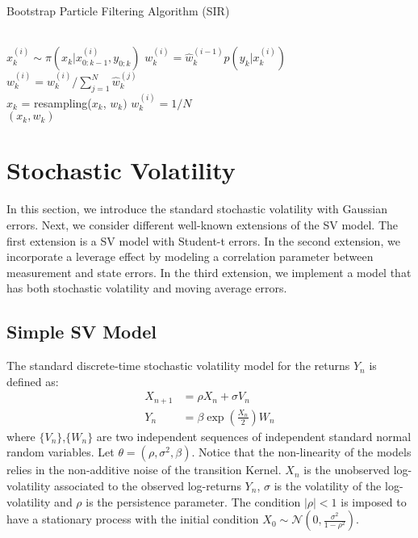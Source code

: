 \documentclass[11pt,a4,twosided,singlespacing,titlepagenumber=on]{scrreprt}
\numberwithin{equation}{chapter} %
\theoremstyle{remark}
\begin{document}
\begin{algorithm}
\caption{Bootstrap Particle Filtering Algorithm (SIR)}\label{euclid}
\begin{algorithmic}[1]
\Procedure{}{}
\\
	\State $x_k^{(i)} \sim \pi(x_k | x_{0:k-1}^{(i)}, y_{0:k})$
	\State $w_k^{(i)} = \hat{w}_k^{(i-1)} p(y_k | x_k^{(i)})$
\\
	\State $w_k^{(i)} = \hat{w}_k^{(i)} / \sum_{j=1}^N \hat{w}_k^{(j)} $
\\
\State $x_k$ = resampling($x_k$, $w_k)$
	\State $w_k^{(i)} = 1 / N$
\\
\EndProcedure
\Return $(x_k, w_k)$

\end{algorithmic}
\end{algorithm}

\newpage


\section{Stochastic Volatility}
In this section, we introduce the standard stochastic volatility with Gaussian errors. Next, we consider different well-known extensions of the SV model. The first extension is a SV model with Student-t errors. In the second extension, we incorporate a leverage effect by modeling a correlation parameter between measurement and state errors. In the third extension, we implement a model that has both stochastic volatility and moving average errors.

\subsection{Simple SV Model}
The standard discrete-time stochastic volatility model for the returns $Y_n$ is defined as:
\begin{align*}
  X_{n+1} &=  \rho X_{n} + \sigma V_n \\
  Y_n &=  \beta \exp \left( \frac{X_n}{2} \right) W_n
\end{align*}
where  $\{V_n\}$,$\{W_n\}$ are two independent sequences of independent standard normal random variables. Let $\theta = (\rho, \sigma^2, \beta)$. Notice that the non-linearity of the models relies in the non-additive noise of the transition Kernel. $X_n$ is the unobserved log-volatility associated to the observed log-returns $Y_n$, $\sigma$ is the volatility of the log-volatility and $\rho$ is the persistence parameter. The condition $|\rho| < 1$  is imposed to have a stationary process with the initial condition $X_0 \sim \mathcal{N} \left(0, \frac{\sigma^2}{1-\rho^2} \right)$.
\end{document}
